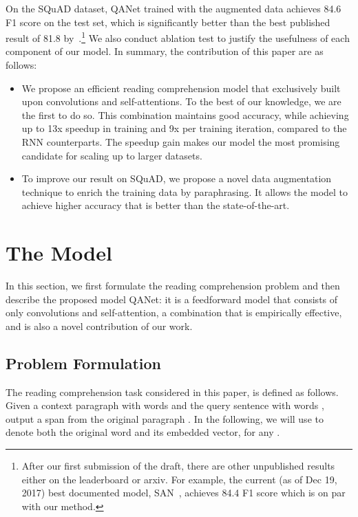 \documentclass{article} \usepackage{iclr2018_conference,times}
\begin{document}
On the SQuAD dataset, QANet trained with the augmented data achieves 84.6 F1 score on the test set,
which is significantly better than the best published result of 81.8 by~\cite{HuPQ17}.\footnote{After our first submission of the draft, there are other unpublished results either on the leaderboard or arxiv. For example, the current (as of Dec 19, 2017) best documented model, SAN~\cite{Liu17}, achieves 84.4 F1 score which is on par with our method.} We also conduct ablation test to justify the usefulness of each component of our model. 
In summary, the contribution of this paper are as follows:
\begin{itemize}
\item We propose an efficient reading comprehension model that exclusively built upon convolutions and self-attentions. To the best of our knowledge, we are the first to do so. This combination maintains good accuracy, while achieving up to 13x speedup in training and 9x per training iteration, compared to the RNN counterparts. The speedup gain makes our model the most promising candidate for scaling up to larger datasets.
\item To improve our result on SQuAD, we propose a novel data augmentation technique to enrich the training data by paraphrasing. 
It allows the model to achieve higher accuracy that is better than the state-of-the-art.
\end{itemize}

%
 \section{The Model}\label{sec:model}
In this section, we first formulate the reading comprehension problem and then describe the proposed  model QANet: it is a feedforward model that consists of only convolutions and self-attention, a combination that is empirically effective, and is also a novel contribution of our work.

\subsection{Problem Formulation}
The reading comprehension task considered in this paper, is defined as follows. Given a context paragraph with  words  and the query sentence with  words , output a span  from the original paragraph . In the following, we will use  to denote both the original word and its embedded vector, for any .
\end{document}
